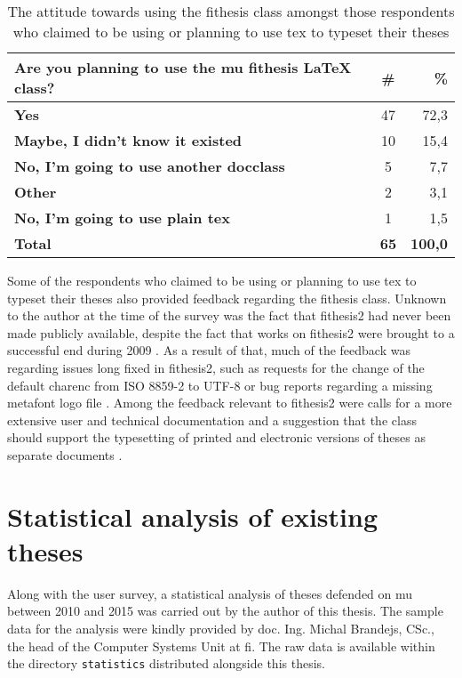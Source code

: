   \begin{table}
    \begin{tabularx}{\textwidth}{Xcr}
      \textbf{Are you planning to use the \gls{mu} fithesis \LaTeX{} class?} & \textbf{\#} & \textbf{\%} \\
      \hline
      \textbf{Yes}                                         & 47          & 72,3 \\
      \textbf{Maybe, I didn't know it existed}             & 10          & 15,4 \\
      \textbf{No, I'm going to use another \gls{docclass}} & 5           &  7,7 \\
      \textbf{Other}                                       & 2           &  3,1 \\
      \textbf{No, I'm going to use plain \gls{tex}}        & 1           &  1,5 \\
      \hline
      \textbf{Total}                                       & \textbf{65} & \textbf{100,0}
    \end{tabularx}
    \caption{The attitude towards using the fithesis class amongst those respondents who claimed to be using or planning to use \gls{tex} to typeset their theses}
    \label{table:survey-tex}
  \end{table}

  Some of the respondents who claimed to be using or planning to use \gls{tex} to typeset their theses also provided feedback regarding the fithesis class. Unknown to the author at the time of the survey was the fact that fithesis2 had never been made publicly available, despite the fact that works on fithesis2 were brought to a successful end during 2009 \cite{Filipcik09}. As a result of that, much of the feedback was regarding issues long fixed in fithesis2, such as requests for the change of the default \gls{charenc} from ISO 8859-2 to UTF-8 \cite[section~4.1]{Filipcik09} or bug reports regarding a missing metafont logo file \cite{fithesis2@fbd7a25}. Among the feedback relevant to fithesis2 were calls for a more extensive user and technical documentation \pending{} and a suggestion that the class should support the typesetting of printed and electronic versions of theses as separate documents \pending{}.

  \section{Statistical analysis of existing theses}
  Along with the user survey, a statistical analysis of theses defended on \gls{mu} between 2010 and 2015 was carried out by the author of this thesis. The sample data for the analysis were kindly provided by doc. Ing. Michal Brandejs, CSc., the head of the Computer Systems Unit at \gls{fi}. The raw data is available within the directory \texttt{statistics} distributed alongside this thesis.

